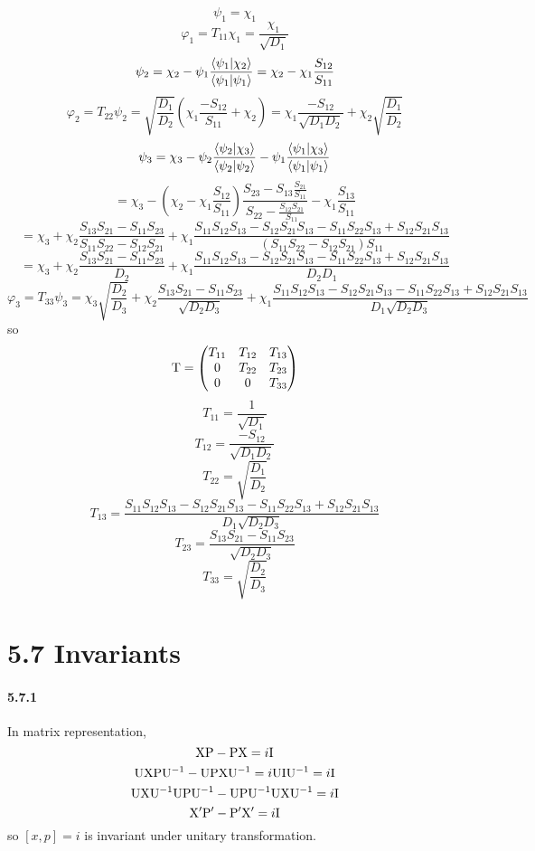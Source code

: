 \documentclass[a4paper]{article}
\begin{document}
\[
\psi_1=\chi_1
\]
\[
\varphi_1=T_{11}\chi_1=\frac{\chi_1}{\sqrt{D_1}}
\]
\[
\psi_2=\chi_2-\psi_1\frac{\langle\psi_1|\chi_2\rangle}{\langle\psi_1|\psi_1\rangle}=\chi_2-\chi_1\frac{S_{12}}{S_{11}}
\]
\[
\varphi_2=T_{22}\psi_2=\sqrt{\frac{D_1}{D_2}}(\chi_1\frac{-S_{12}}{S_{11}}+\chi_2)=\chi_1\frac{-S_{12}}{\sqrt{D_1D_2}}+\chi_2\sqrt{\frac{D_1}{D_2}}
\]
\[
\psi_3=\chi_3-\psi_2\frac{\langle\psi_2|\chi_3\rangle}{\langle\psi_2|\psi_2\rangle}-\psi_1\frac{\langle\psi_1|\chi_3\rangle}{\langle\psi_1|\psi_1\rangle}
\]
\[
=\chi_3-(\chi_2-\chi_1\frac{S_{12}}{S_{11}})\frac{S_{23}-S_{13}\frac{S_{21}}{S_{11}}}{S_{22}-\frac{S_{12}S_{21}}{S_{11}}}-\chi_1\frac{S_{13}}{S_{11}}
\]
\[
=\chi_3+\chi_2\frac{S_{13}S_{21}-S_{11}S_{23}}{S_{11}S_{22}-S_{12}S_{21}}+\chi_1\frac{S_{11}S_{12}S_{13}-S_{12}S_{21}S_{13}-S_{11}S_{22}S_{13}+S_{12}S_{21}S_{13}}{(S_{11}S_{22}-S_{12}S_{21})S_{11}}
\]
\[
=\chi_3+\chi_2\frac{S_{13}S_{21}-S_{11}S_{23}}{D_2}+\chi_1\frac{S_{11}S_{12}S_{13}-S_{12}S_{21}S_{13}-S_{11}S_{22}S_{13}+S_{12}S_{21}S_{13}}{D_2D_1}
\]
\[
\varphi_3=T_{33}\psi_3=\chi_3\sqrt{\frac{D_2}{D_3}}+\chi_2\frac{S_{13}S_{21}-S_{11}S_{23}}{\sqrt{D_2D_3}}+\chi_1\frac{S_{11}S_{12}S_{13}-S_{12}S_{21}S_{13}-S_{11}S_{22}S_{13}+S_{12}S_{21}S_{13}}{D_1\sqrt{D_2D_3}}
\]
so
\[\mathrm{T}=
\begin{pmatrix}
T_{11}&T_{12}&T_{13}\\
0&T_{22}&T_{23}\\
0&0&T_{33}
\end{pmatrix}
\]
\[
T_{11}=\frac{1}{\sqrt{D_1}}\]
\[T_{12}=\frac{-S_{12}}{\sqrt{D_1D_2}}\] \[T_{22}=\sqrt{\frac{D_1}{D_2}}
\]
\[
T_{13}=\frac{S_{11}S_{12}S_{13}-S_{12}S_{21}S_{13}-S_{11}S_{22}S_{13}+S_{12}S_{21}S_{13}}{D_1\sqrt{D_2D_3}}
\]
\[
T_{23}=\frac{S_{13}S_{21}-S_{11}S_{23}}{\sqrt{D_2D_3}}
\]
\[
T_{33}=\sqrt{\frac{D_2}{D_3}}
\]

\section*{5.7 Invariants}

\paragraph{5.7.1}
In matrix representation,
\[
\mathrm{X}\mathrm{P}-\mathrm{P}\mathrm{X}=i\mathrm{I}
\]
\[
\mathrm{U}\mathrm{X}\mathrm{P}\mathrm{U}^{-1}-\mathrm{U}\mathrm{P}\mathrm{X}\mathrm{U}^{-1}=i\mathrm{U}\mathrm{I}\mathrm{U}^{-1}=i\mathrm{I}
\]
\[
\mathrm{U}\mathrm{X}\mathrm{U}^{-1}\mathrm{U}\mathrm{P}\mathrm{U}^{-1}-\mathrm{U}\mathrm{P}\mathrm{U}^{-1}\mathrm{U}\mathrm{X}\mathrm{U}^{-1}=i\mathrm{I}
\]
\[
\mathrm{X}'\mathrm{P}'-\mathrm{P}'\mathrm{X}'=i\mathrm{I}
\]
so $[x,p]=i$ is invariant under unitary transformation.
\end{document}
